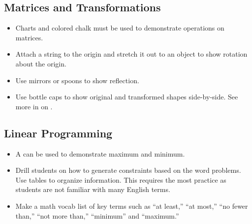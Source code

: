 	\subsection{Matrices and Transformations}
	\begin{itemize}
	\item Charts and colored chalk must be used to demonstrate operations on matrices.
	\item Attach a string to the origin and stretch it out to an object to show rotation about the origin.
	\item Use mirrors or spoons to show reflection.
	\item Use bottle caps to show original and transformed shapes side-by-side. See more in  on .
	\end{itemize}

	\subsection{Linear Programming}
	\begin{itemize}
	\item A  can be used to demonstrate maximum and minimum.
	\item Drill students on how to generate constraints based on the word problems. Use tables to organize information. This requires the most practice as students are not familiar with many English terms.
	\item Make a math vocab list of key terms such as ``at least,'' ``at most,'' ``no fewer than,'' ``not more than,'' ``minimum'' and ``maximum.''
	\end{itemize}
